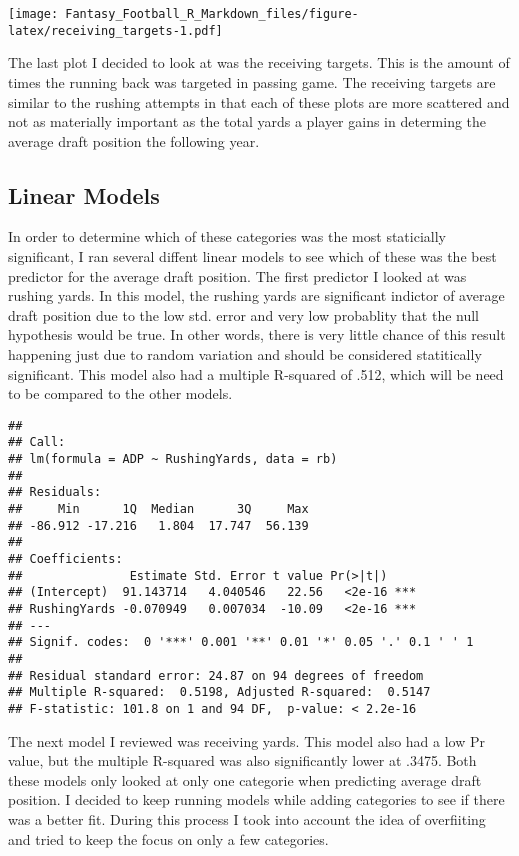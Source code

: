 \documentclass[]{article}
\begin{document}
\texttt{[image: Fantasy\_Football\_R\_Markdown\_files/figure-latex/receiving\_targets-1.pdf]}

The last plot I decided to look at was the receiving targets. This is
the amount of times the running back was targeted in passing game. The
receiving targets are similar to the rushing attempts in that each of
these plots are more scattered and not as materially important as the
total yards a player gains in determing the average draft position the
following year.

\subsection{Linear Models}\label{linear-models}

In order to determine which of these categories was the most staticially
significant, I ran several diffent linear models to see which of these
was the best predictor for the average draft position. The first
predictor I looked at was rushing yards. In this model, the rushing
yards are significant indictor of average draft position due to the low
std. error and very low probablity that the null hypothesis would be
true. In other words, there is very little chance of this result
happening just due to random variation and should be considered
statitically significant. This model also had a multiple R-squared of
.512, which will be need to be compared to the other models.

\begin{verbatim}
## 
## Call:
## lm(formula = ADP ~ RushingYards, data = rb)
## 
## Residuals:
##     Min      1Q  Median      3Q     Max 
## -86.912 -17.216   1.804  17.747  56.139 
## 
## Coefficients:
##               Estimate Std. Error t value Pr(>|t|)    
## (Intercept)  91.143714   4.040546   22.56   <2e-16 ***
## RushingYards -0.070949   0.007034  -10.09   <2e-16 ***
## ---
## Signif. codes:  0 '***' 0.001 '**' 0.01 '*' 0.05 '.' 0.1 ' ' 1
## 
## Residual standard error: 24.87 on 94 degrees of freedom
## Multiple R-squared:  0.5198, Adjusted R-squared:  0.5147 
## F-statistic: 101.8 on 1 and 94 DF,  p-value: < 2.2e-16
\end{verbatim}

The next model I reviewed was receiving yards. This model also had a low
Pr value, but the multiple R-squared was also significantly lower at
.3475. Both these models only looked at only one categorie when
predicting average draft position. I decided to keep running models
while adding categories to see if there was a better fit. During this
process I took into account the idea of overfiiting and tried to keep
the focus on only a few categories.
\end{document}
